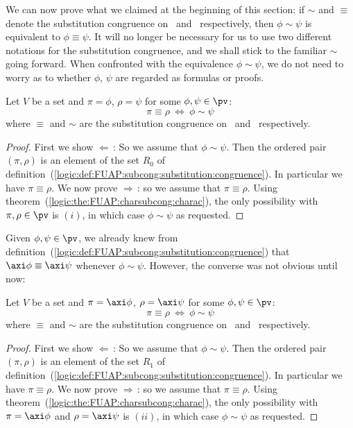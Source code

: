 We can now prove what we claimed at the beginning of this section:
if $\sim$ and $\equiv$ denote the substitution congruence on \pv\
and \pvs\ respectively, then $\phi\sim\psi$ is equivalent to
$\phi\equiv\psi$. It will no longer be necessary for us to use two
different notations for the substitution congruence, and we shall
stick to the familiar $\sim$ going forward. When confronted with the
equivalence $\phi\sim\psi$, we do not need to worry as to whether
$\phi$, $\psi$ are regarded as formulas or proofs.

\begin{prop}\label{logic:prop:FUAP:charsubsong:equivalence:formula}
Let $V$ be a set and $\pi=\phi$, $\rho=\psi$ for some
$\phi,\psi\in\pv$:
    \[
    \pi\equiv\rho\ \Leftrightarrow\ \phi\sim\psi
    \]
where $\equiv$ and $\sim$ are the substitution congruence on \pvs\
and \pv\ respectively.
\end{prop}
\begin{proof}
First we show $\Leftarrow$\,: So we assume that $\phi\sim\psi$. Then
the ordered pair $(\pi,\rho)$ is an element of the set $R_{0}$ of
definition~(\ref{logic:def:FUAP:subcong:substitution:congruence}).
In particular we have $\pi\equiv\rho$. We now prove $\Rightarrow$\,:
so we assume that $\pi\equiv\rho$. Using
theorem~(\ref{logic:the:FUAP:charsubcong:charac}), the only
possibility with $\pi,\rho\in\pv$ is $(i)$, in which case
$\phi\sim\psi$ as requested.
\end{proof}

Given $\phi,\psi\in\pv$, we already knew from
definition~(\ref{logic:def:FUAP:subcong:substitution:congruence})
that $\axi\phi\equiv\axi\psi$ whenever $\phi\sim\psi$. However, the
converse was not obvious until now:

\begin{prop}\label{logic:prop:FUAP:charsubsong:equivalence:axiom}
Let $V$ be a set and $\pi=\axi\phi$, $\rho=\axi\psi$ for some
$\phi,\psi\in\pv$:
    \[
    \pi\equiv\rho\ \Leftrightarrow\ \phi\sim\psi
    \]
where $\equiv$ and $\sim$ are the substitution congruence on \pvs\
and \pv\ respectively.
\end{prop}
\begin{proof}
First we show $\Leftarrow$\,: So we assume that $\phi\sim\psi$. Then
the ordered pair $(\pi,\rho)$ is an element of the set $R_{1}$ of
definition~(\ref{logic:def:FUAP:subcong:substitution:congruence}).
In particular we have $\pi\equiv\rho$. We now prove $\Rightarrow$\,:
so we assume that $\pi\equiv\rho$. Using
theorem~(\ref{logic:the:FUAP:charsubcong:charac}), the only
possibility with $\pi=\axi\phi$ and $\rho=\axi\psi$ is $(ii)$, in
which case $\phi\sim\psi$ as requested.
\end{proof}
